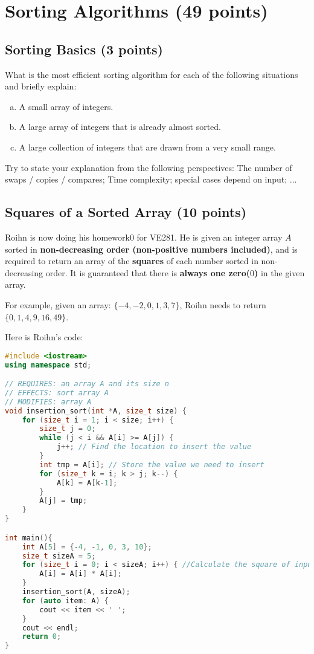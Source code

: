 \documentclass[11pt]{exam}
\begin{document}
\section{Sorting Algorithms (49 points)}

\subsection{Sorting Basics (3 points)}
What is the most efficient sorting algorithm for each of the following situations and briefly explain:
\begin{enumerate}[(a)]
\item A small array of integers.
\item A large array of integers that is already almost sorted.
\item A large collection of integers that are drawn from a very small range.
\end{enumerate}
Try to state your explanation from the following perspectives: The number of swaps / copies / compares; Time complexity; special cases depend on input; ...
\begin{solution}
\end{solution}

\subsection{Squares of a Sorted Array (10 points)}
Roihn is now doing his homework0 for VE281. He is given an integer array $A$ sorted in \textbf{non-decreasing order (non-positive numbers included)}, and is required to return an array of the \textbf{squares} of each number sorted in non-decreasing order. It is guaranteed that there is \textbf{always one zero($0$)} in the given array. 

For example, given an array: $\{-4,-2,0,1,3,7\}$, Roihn needs to return $\{0,1,4,9,16,49\}$.

Here is Roihn's code:
\begin{lstlisting}[language=c++]
#include <iostream>
using namespace std;

// REQUIRES: an array A and its size n
// EFFECTS: sort array A
// MODIFIES: array A
void insertion_sort(int *A, size_t size) {
    for (size_t i = 1; i < size; i++) {
        size_t j = 0;
        while (j < i && A[i] >= A[j]) {
            j++; // Find the location to insert the value
        }
        int tmp = A[i]; // Store the value we need to insert
        for (size_t k = i; k > j; k--) {
            A[k] = A[k-1];
        }
        A[j] = tmp;
    }
}

int main(){
    int A[5] = {-4, -1, 0, 3, 10};
    size_t sizeA = 5;
    for (size_t i = 0; i < sizeA; i++) { //Calculate the square of input array
        A[i] = A[i] * A[i];
    }
    insertion_sort(A, sizeA);
    for (auto item: A) {
        cout << item << ' ';
    }
    cout << endl;
    return 0;
}
\end{lstlisting}
\end{document}

